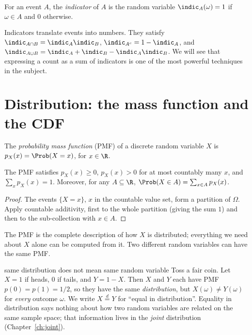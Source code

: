 \begin{definition}
For an event $A$, the \emph{indicator} of $A$ is the random variable
$\indic_A(\omega)=1$ if $\omega\in A$ and $0$ otherwise.
\end{definition}

Indicators translate events into numbers. They satisfy
$\indic_{A\cap B}=\indic_A\indic_B$, $\indic_{A^c}=1-\indic_A$, and
$\indic_{A\cup B}=\indic_A+\indic_B-\indic_A\indic_B$. We will see that
expressing a count as a sum of indicators is one of the most powerful techniques
in the subject.

\section{Distribution: the mass function and the CDF}

\begin{definition}
The \emph{probability mass function} (PMF) of a discrete random variable $X$ is
$p_X(x)=\Prob(X=x)$, for $x\in\R$.
\end{definition}

\begin{proposition}\label{prop:pmf}
The PMF satisfies $p_X(x)\ge0$, $p_X(x)>0$ for at most countably many $x$, and
$\sum_xp_X(x)=1$. Moreover, for any $A\subseteq\R$,
$\Prob(X\in A)=\sum_{x\in A}p_X(x)$.
\end{proposition}
\begin{proof}
The events $\{X=x\}$, $x$ in the countable value set, form a partition of
$\Omega$. Apply countable additivity, first to the whole partition (giving the
sum $1$) and then to the sub-collection with $x\in A$.
\end{proof}

The PMF is the complete description of how $X$ is distributed; everything we
need about $X$ alone can be computed from it. Two different random variables
can have the same PMF.

\begin{nuance}{same distribution does not mean same random variable}
Toss a fair coin. Let $X=1$ if heads, $0$ if tails, and $Y=1-X$. Then $X$ and $Y$
each have PMF $p(0)=p(1)=1/2$, so they have the same \emph{distribution}, but
$X(\omega)\ne Y(\omega)$ for \emph{every} outcome $\omega$. We write
$X\overset{d}{=}Y$ for ``equal in distribution''. Equality in distribution says
nothing about how two random variables are related on the same sample space;
that information lives in the \emph{joint} distribution (Chapter~\ref{ch:joint}).
\end{nuance}

